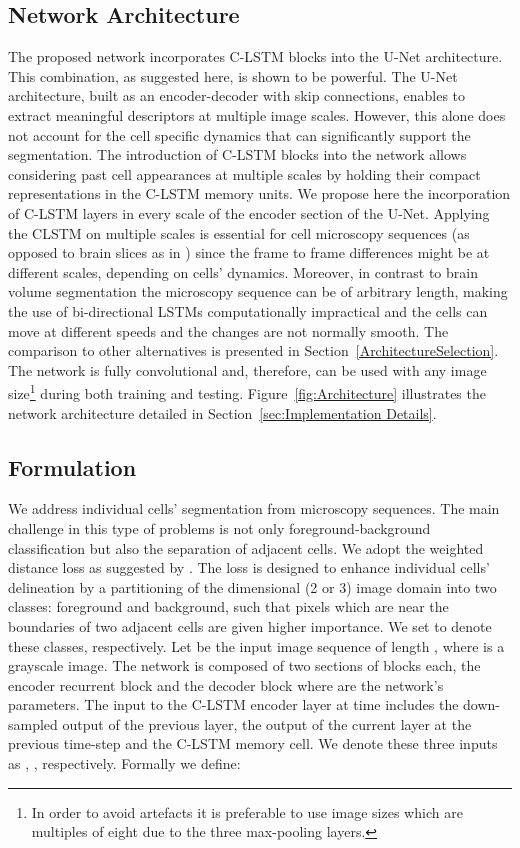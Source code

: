 \documentclass{article}
\begin{document}
\subsection{Network Architecture}\label{subsec:Network-Architecture} 
The proposed network incorporates C-LSTM \cite{xingjian15convLSTM} blocks into the U-Net \cite{Ronneberger15} architecture. This combination, as suggested here, is shown to be powerful. The U-Net architecture, built as an encoder-decoder with skip connections, enables to extract meaningful descriptors at multiple image scales. However, this alone does not account for the cell specific dynamics that can significantly support the segmentation. The introduction of C-LSTM blocks into the network allows considering past cell appearances at multiple scales by holding their compact representations in the C-LSTM memory units.
We propose here the incorporation of C-LSTM layers in every scale of the encoder section of the U-Net. Applying the CLSTM on multiple scales is essential for cell microscopy sequences (as opposed to brain slices as in \cite{chen2016combining}) since the frame to frame differences might be at different scales, depending on cells' dynamics. Moreover, in contrast to brain volume segmentation \cite{chen2016combining} the microscopy sequence can be of arbitrary length, making the use of bi-directional LSTMs computationally impractical and the cells can move at different speeds and the changes are not normally smooth. 
The comparison to other alternatives is presented in Section~\ref{ArchitectureSelection}. 
The network is fully convolutional and, therefore, can be used with any image size\footnote{In order to avoid artefacts it is preferable to use image sizes which are multiples of eight due to the three max-pooling layers.} during both training and testing. Figure~\ref{fig:Architecture} illustrates the network architecture detailed in Section~\ref{sec:Implementation Details}.
 \subsection{Formulation}\label{subsec:Formulation} 
We address individual cells' segmentation from microscopy sequences. The main challenge in this type of problems is not only foreground-background classification but also the separation of adjacent cells. We adopt the  weighted distance loss as suggested by \cite{Ronneberger15}. The loss is designed to enhance individual cells' delineation by a partitioning of the  dimensional (2 or 3) image domain  into two classes: foreground and background, such that pixels which are near the boundaries of two adjacent cells are given higher importance.
We set   to denote these classes, respectively. Let  be the input image sequence of length , where  is a grayscale image. 
The network is composed of two sections of  blocks each, the encoder recurrent block  and the decoder block   where  are the network's parameters. 
The input to the C-LSTM encoder layer  at time  includes the down-sampled output of the previous layer, the output of the current layer at the previous time-step and the C-LSTM memory cell. We denote these three inputs as , ,  respectively. Formally we define: 
\end{document}
